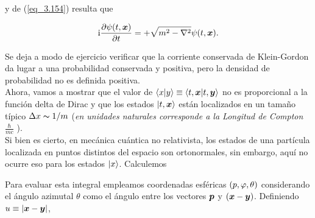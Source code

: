  y de (\ref{eq_3.154}) resulta que
 
  
 \begin{equation}
 	\ii \pdv{\psi (t,\vb*{x})}{t} = + \sqrt{m^2 - \laplacian } \psi (t,\vb*{x}). 
 \end{equation}
 
 Se deja a modo de ejercicio verificar que la corriente conservada de Klein-Gordon da lugar a una probabilidad conservada y positiva, pero la densidad de probabilidad no es definida positiva.\\
 
 Ahora, vamos a mostrar que el valor de $\braket{x}{y} \equiv \braket{t,\vb*{x}}{t,\vb*{y}}$ no es proporcional a la función delta de Dirac y que los estados $\ket{t,\vb*{x}}$ están localizados en un tamaño típico $\Delta x \thicksim 1/m $ (\emph{en unidades naturales corresponde a la Longitud de Compton} $\frac{\hbar}{mc} $ ).\\
 
 Si bien es cierto, en mecánica cuántica no relativista, los estados de una partícula localizada en puntos distintos del espacio son ortonormales, sin embargo, aquí no ocurre eso para los estados $\ket{x}$. Calculemos
 
 
 Para evaluar esta integral empleamos coordenadas esféricas $\qty(p,\varphi,\theta )$ considerando el ángulo azimutal $\theta$ como el ángulo entre los vectores $\vb*{p}$ y $(\vb*{x}-\vb*{y})$. Definiendo $u \equiv \abs{\vb*{x}-\vb*{y}}$,
 
